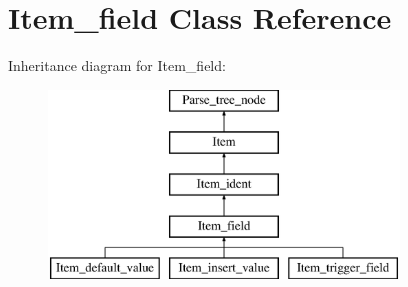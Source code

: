 \hypertarget{classItem__field}{}\section{Item\+\_\+field Class Reference}
\label{classItem__field}
Inheritance diagram for Item\+\_\+field\+:\begin{figure}[H]
\begin{center}
\leavevmode
\includegraphics[height=5.000000cm]{classItem__field}
\end{center}
\end{figure}
